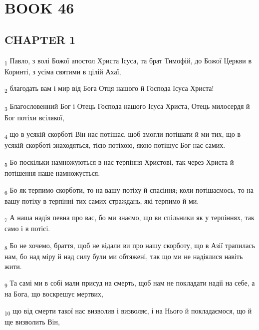 \section{BOOK 46}
\subsection{CHAPTER 1}
\begin{tcolorbox}
\textsubscript{1} Павло, з волі Божої апостол Христа Ісуса, та брат Тимофій, до Божої Церкви в Коринті, з усіма святими в цілій Ахаї,
\end{tcolorbox}
\begin{tcolorbox}
\textsubscript{2} благодать вам і мир від Бога Отця нашого й Господа Ісуса Христа!
\end{tcolorbox}
\begin{tcolorbox}
\textsubscript{3} Благословенний Бог і Отець Господа нашого Ісуса Христа, Отець милосердя й Бог потіхи всілякої,
\end{tcolorbox}
\begin{tcolorbox}
\textsubscript{4} що в усякій скорботі Він нас потішає, щоб змогли потішати й ми тих, що в усякій скорботі знаходяться, тією потіхою, якою потішує Бог нас самих.
\end{tcolorbox}
\begin{tcolorbox}
\textsubscript{5} Бо поскільки намножуються в нас терпіння Христові, так через Христа й потішення наше намножується.
\end{tcolorbox}
\begin{tcolorbox}
\textsubscript{6} Бо як терпимо скорботи, то на вашу потіху й спасіння; коли потішаємось, то на вашу потіху в терпінні тих самих страждань, які терпимо й ми.
\end{tcolorbox}
\begin{tcolorbox}
\textsubscript{7} А наша надія певна про вас, бо ми знаємо, що ви спільники як у терпіннях, так само і в потісі.
\end{tcolorbox}
\begin{tcolorbox}
\textsubscript{8} Бо не хочемо, браття, щоб не відали ви про нашу скорботу, що в Азії трапилась нам, бо над міру й над силу були ми обтяжені, так що ми не надіялися навіть жити.
\end{tcolorbox}
\begin{tcolorbox}
\textsubscript{9} Та самі ми в собі мали присуд на смерть, щоб нам не покладати надії на себе, а на Бога, що воскрешує мертвих,
\end{tcolorbox}
\begin{tcolorbox}
\textsubscript{10} що від смерти такої нас визволив і визволяє, і на Нього й покладаємося, що й ще визволить Він,
\end{tcolorbox}
